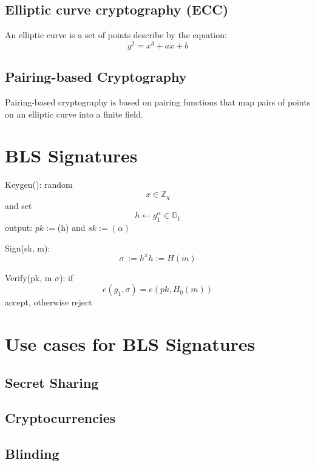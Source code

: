 \documentclass[a4paper,12pt]{scrartcl}
\begin{document}
\subsection{Elliptic curve cryptography (ECC)}
An elliptic curve is a set of points describe by the equation:
\begin{equation*}
y^2 = x^3 + ax + b
\end{equation*}

\subsection{Pairing-based Cryptography}
Pairing-based cryptography is based on pairing functions that map pairs of points on an elliptic curve into a finite field.

\pagebreak

\section{BLS Signatures}
Keygen(): random \[ x\in \mathbb{Z}_{q} \] and set \[ h \leftarrow g_{1}^\alpha\in \mathbb{G}_{1} \] output: \( pk := \)(h) and \( sk := (\alpha) \)


Sign(sk, m): \[ \sigma\ := h^x  h := H(m) \]


Verify(pk, m \(\sigma\)): if \[ e(g_{1},\sigma) = e(pk, H_{0}(m)) \] accept, otherwise reject
\pagebreak

\section{Use cases for BLS Signatures}
\subsection{Secret Sharing}
\subsection{Cryptocurrencies}
\subsection{Blinding}
\pagebreak

\printbibliography
\end{document}
